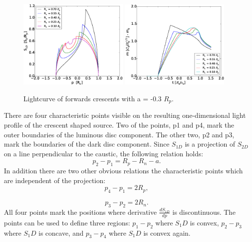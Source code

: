 \documentclass[usenatbib]{mn2e}
\begin{document}
\begin{figure}
\centering
    \includegraphics[width = 0.48\textwidth]{figures/S1D_var_rn_a_neg.eps}
    \includegraphics[width = 0.48\textwidth]{figures/5Rn_forw_var_magnification.eps}
\caption{\label{fig:lightcurve_crescent} Lightcurve of forwards crescents with a = -0.3 $R_p$.}
\end{figure}

There are four characteristic points visible on the resulting one-dimensional light profile of the crescent shaped source. Two of the points, p1 and p4, mark the outer boundaries of the luminous disc component. The other two, p2 and p3, mark the boundaries of the dark disc component. Since $S_{1D}$ is a projection of $S_{2D}$ on a line perpendicular to the caustic, the following relation holds:
\begin{equation}
    p_2-p_1 = R_p -R_n - a.
\end{equation}
In addition there are two other obvious relations the characteristic points which are independent of the projection:
\begin{equation}
    p_4 -p_1 = 2 R_p,
\end{equation}

\begin{equation}
        p_3 -p_2 = 2 R_n.
\end{equation}
All four points mark the positions where derivative $\frac{dS_{1D}}{dp}$ is discontinuous. The points can be used to define three regions: $p_1 - p_2$ where $S_1D$ is convex, $p_2 - p_3$ where $S_1D$ is concave, and $p_3 - p_4$ where $S_1D$ is convex again. \\
\end{document}
